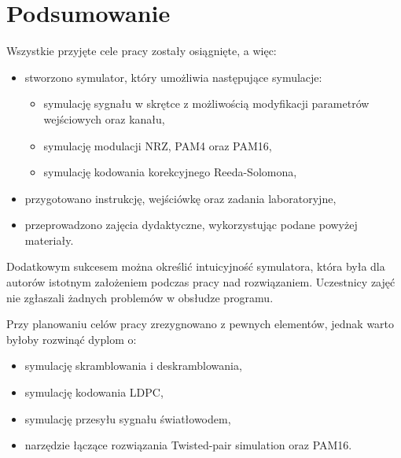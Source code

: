 \section{Podsumowanie}

Wszystkie przyjęte cele pracy zostały osiągnięte, a więc:
\begin{itemize}
    \item stworzono symulator, który umożliwia następujące symulacje:
    \begin{itemize}
        \item symulację sygnału w skrętce z możliwością modyfikacji parametrów wejściowych oraz kanału,
        \item symulację modulacji NRZ, PAM4 oraz PAM16,
        \item symulację kodowania korekcyjnego Reeda-Solomona,
    \end{itemize}
    \item przygotowano instrukcję, wejściówkę oraz zadania laboratoryjne,
    \item przeprowadzono zajęcia dydaktyczne, wykorzystując podane powyżej materiały.
\end{itemize}

Dodatkowym sukcesem można określić intuicyjność symulatora, która była dla autorów istotnym założeniem podczas pracy nad rozwiązaniem. Uczestnicy zajęć nie zgłaszali żadnych problemów w obsłudze programu.

Przy planowaniu celów pracy zrezygnowano z pewnych elementów, jednak warto byłoby rozwinąć dyplom o:
\begin{itemize}
    \item symulację skramblowania i deskramblowania,
    \item symulację kodowania LDPC,
    \item symulację przesyłu sygnału światłowodem,
    \item narzędzie łączące rozwiązania Twisted-pair simulation oraz PAM16.
\end{itemize}